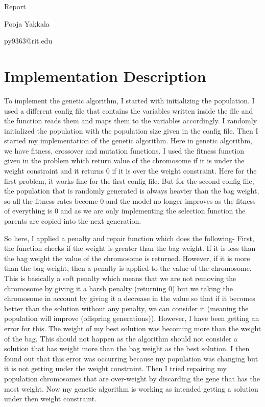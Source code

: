 \documentclass{article}
\begin{document}
\begin{titlepage}
\begin{center} 

        \Huge{Report} \vspace{1cm} 
        
        \large{Pooja Yakkala} \vspace{0.3cm}

        \large{py9363@rit.edu} \vspace{0.3cm} 
        
        
    \end{center} 
\end{titlepage}

\section*{Implementation Description}
To implement the genetic algorithm, I started with initializing the population. I used a different config file that contains the variables written inside the file and the function reads them and maps them to the variables accordingly. I randomly initialized the population with the population size given in the config file. Then I started my implementation of the genetic algorithm. Here in genetic algorithm, we have fitness, crossover and mutation functions. I used the fitness function given in the problem which return value of the chromosome if it is under the weight constraint and it returns 0 if it is over the weight constraint. Here for the first problem, it works fine for the first config file. But for the second config file, the population that is randomly generated is always heavier than the bag weight, so all the fitness rates become 0 and the model no longer improves as the fitness of everything is 0 and as we are only implementing the selection function the parents are copied into the next generation. 

So here, I applied a penalty and repair function which does the following- First, the function checks if the weight is greater than the bag weight. If it is less than the bag weight the value of the chromosome is returned. However, if it is more than the bag weight, then a penalty is applied to the value of the chromosome. This is basically a soft penalty which means that we are not removing the chromosome by giving it a harsh penalty (returning 0) but we taking the chromosome in account by giving it a decrease in the value so that if it becomes better than the solution without any penalty, we can consider it (meaning the population will improve (offspring generations)). However, I have been getting an error for this. The weight of my best solution was becoming more than the weight of the bag. This should not happen as the algorithm should not consider a solution that has weight more than the bag weight as the best solution. I then found out that this error was occurring because my population was changing but it is not getting under the weight constraint. Then I tried repairing my population chromosomes that are over-weight by discarding the gene that has the most weight. Now my genetic algorithm is working as intended getting a solution under then weight constraint.
\end{document}
